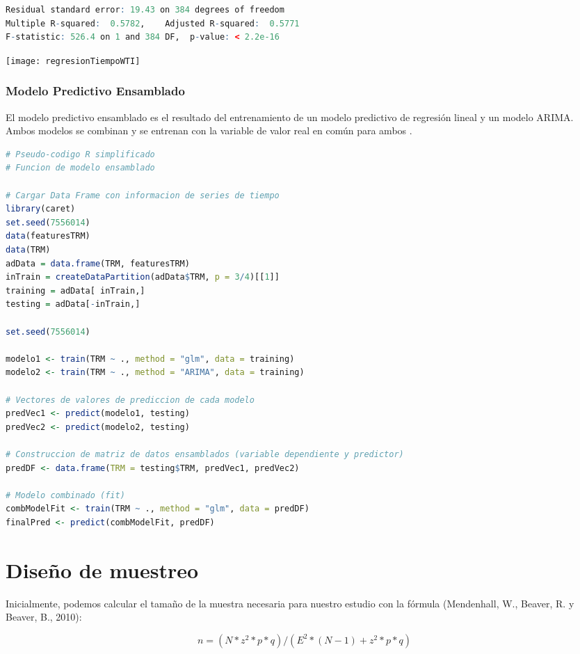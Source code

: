\begin{spacing}{1.5}
\begin{lstlisting}[language=R]
Residual standard error: 19.43 on 384 degrees of freedom
Multiple R-squared:  0.5782,	Adjusted R-squared:  0.5771 
F-statistic: 526.4 on 1 and 384 DF,  p-value: < 2.2e-16
\end{lstlisting}

\texttt{[image: regresionTiempoWTI]}\\

\subsubsection{Modelo Predictivo Ensamblado} 
El modelo predictivo ensamblado es el resultado del entrenamiento de un modelo predictivo de regresión lineal y un modelo ARIMA. Ambos modelos se combinan y se entrenan con la variable de valor real en común para ambos \cite{viswanathan}.

\begin{lstlisting}[language=R]
# Pseudo-codigo R simplificado
# Funcion de modelo ensamblado

# Cargar Data Frame con informacion de series de tiempo
library(caret)
set.seed(7556014)
data(featuresTRM)
data(TRM)
adData = data.frame(TRM, featuresTRM)
inTrain = createDataPartition(adData$TRM, p = 3/4)[[1]]
training = adData[ inTrain,]
testing = adData[-inTrain,]

set.seed(7556014)

modelo1 <- train(TRM ~ ., method = "glm", data = training)
modelo2 <- train(TRM ~ ., method = "ARIMA", data = training)

# Vectores de valores de prediccion de cada modelo
predVec1 <- predict(modelo1, testing)
predVec2 <- predict(modelo2, testing)

# Construccion de matriz de datos ensamblados (variable dependiente y predictor)
predDF <- data.frame(TRM = testing$TRM, predVec1, predVec2)

# Modelo combinado (fit)
combModelFit <- train(TRM ~ ., method = "glm", data = predDF)
finalPred <- predict(combModelFit, predDF) 
\end{lstlisting}

\section{Diseño de muestreo}

Inicialmente, podemos calcular el tamaño de la muestra necesaria para nuestro estudio con la fórmula (Mendenhall, W., Beaver, R. y Beaver, B., 2010):

\[ n =  (N* z^2*p*q)/(E^2*(N-1)+ z^2*p*q)\]


\end{spacing}
